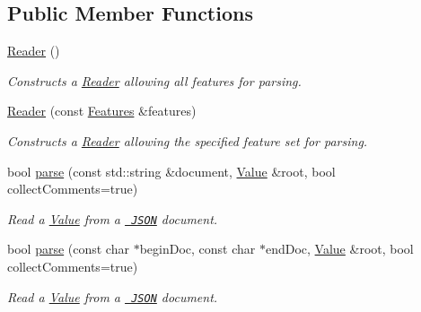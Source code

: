 \subsection*{Public Member Functions}
\begin{DoxyCompactItemize}
\item 
\mbox{\label{class_json_1_1_reader_a0b3c4e24c8393354bab57a6ba3ffc27f}} 
\mbox{\hyperlink{class_json_1_1_reader_a0b3c4e24c8393354bab57a6ba3ffc27f}{Reader}} ()
\begin{DoxyCompactList}\small\item\em Constructs a \mbox{\hyperlink{class_json_1_1_reader}{Reader}} allowing all features for parsing. \end{DoxyCompactList}\item 
\mbox{\label{class_json_1_1_reader_a45f17831118337309180313e93ac33f8}} 
\mbox{\hyperlink{class_json_1_1_reader_a45f17831118337309180313e93ac33f8}{Reader}} (const \mbox{\hyperlink{class_json_1_1_features}{Features}} \&features)
\begin{DoxyCompactList}\small\item\em Constructs a \mbox{\hyperlink{class_json_1_1_reader}{Reader}} allowing the specified feature set for parsing. \end{DoxyCompactList}\item 
bool \mbox{\hyperlink{class_json_1_1_reader_af1da6c976ad1e96c742804c3853eef94}{parse}} (const std\+::string \&document, \mbox{\hyperlink{class_json_1_1_value}{Value}} \&root, bool collect\+Comments=true)
\begin{DoxyCompactList}\small\item\em Read a \mbox{\hyperlink{class_json_1_1_value}{Value}} from a \href{http://www.json.org}{\texttt{ J\+S\+ON}} document. \end{DoxyCompactList}\item 
bool \mbox{\hyperlink{class_json_1_1_reader_ac71ef2b64c7c27b062052e692af3fb32}{parse}} (const char $\ast$begin\+Doc, const char $\ast$end\+Doc, \mbox{\hyperlink{class_json_1_1_value}{Value}} \&root, bool collect\+Comments=true)
\begin{DoxyCompactList}\small\item\em Read a \mbox{\hyperlink{class_json_1_1_value}{Value}} from a \href{http://www.json.org}{\texttt{ J\+S\+ON}} document. \end{DoxyCompactList}\item 

\end{DoxyCompactItemize}
